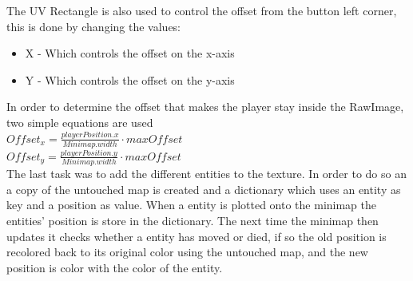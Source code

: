 The UV Rectangle is also used to control the offset from the button left corner, this is done by changing the values:
\begin{itemize}
\item X - Which controls the offset on the x-axis
\item Y - Which controls the offset on the y-axis
\end{itemize}
In order to determine the offset that makes the player stay inside the RawImage, two simple equations are used\\
$Offset_x = \frac{playerPosition.x}{Minimap.width} \cdot maxOffset$\\
$Offset_y = \frac{playerPosition.y}{Minimap.width} \cdot maxOffset$\\
The last task was to add the different entities to the texture. 
In order to do so an a copy of the untouched map is created and a dictionary which uses an entity as key and a position as value.
When a entity is plotted onto the minimap the entities' position is store in the dictionary.
The next time the minimap then updates it checks whether a entity has moved or died, if so the old position is recolored back to its original color using the untouched map, and the new position is color with the color of the entity.
